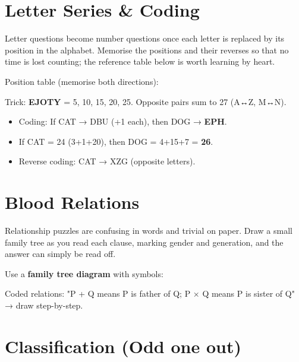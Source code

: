 \needspace{155pt}

\hypertarget{p1-05--2-letter-series--coding}{%
\section{Letter Series \& Coding}\label{p1-05--2-letter-series--coding}}

Letter questions become number questions once each letter is replaced by its position in the alphabet.
Memorise the positions and their reverses so that no time is lost counting; the reference table below is
worth learning by heart.

Position table (memorise both directions):



Trick: \textbf{EJOTY} = 5, 10, 15, 20, 25. Opposite pairs sum to 27 (A↔Z, M↔N).

\begin{itemize}
\tightlist
\item
  Coding: If CAT → DBU (+1 each), then DOG → \textbf{EPH}.
\item
  If CAT = 24 (3+1+20), then DOG = 4+15+7 = \textbf{26}.
\item
  Reverse coding: CAT → XZG (opposite letters).
\end{itemize}

\needspace{155pt}

\hypertarget{p1-05--3-blood-relations}{%
\section{Blood Relations}\label{p1-05--3-blood-relations}}

Relationship puzzles are confusing in words and trivial on paper. Draw a small family tree as you read each
clause, marking gender and generation, and the answer can simply be read off.

Use a \textbf{family tree diagram} with symbols:



Coded relations: "P + Q means P is father of Q; P × Q means P is sister of Q" → draw step-by-step.

\needspace{227pt}

\hypertarget{p1-05--4-classification-odd-one-out}{%
\section{Classification (Odd one out)}\label{p1-05--4-classification-odd-one-out}}

